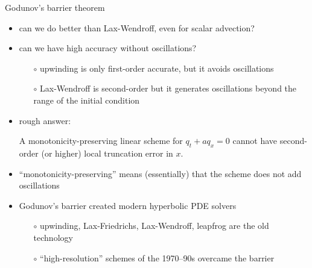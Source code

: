 \documentclass[10pt,dvipsnames,usepdftitle=false,
hyperref={pdftitle = {Finite volume methods},
    pdfauthor = {Ed Bueler}}]{beamer}
\begin{document}
\begin{frame}{Godunov's barrier theorem}

\begin{itemize}
\item can we do better than Lax-Wendroff, even for scalar advection?
\item can we have high accuracy without oscillations?
    \begin{itemize}
    \item[$\circ$] upwinding is only first-order accurate, but it avoids oscillations
    \item[$\circ$] Lax-Wendroff is second-order but it generates oscillations beyond the range of the initial condition
    \end{itemize}
\item rough answer: 

\medskip
\begin{theorem}  A monotonicity-preserving \alert<2>{linear} scheme for $q_t + a q_x=0$ cannot have second-order (or higher) local truncation error in $x$.\end{theorem}

\item ``monotonicity-preserving'' means (essentially) that the scheme does not add oscillations
\item Godunov's barrier created modern hyperbolic PDE solvers
    \begin{itemize}
    \item[$\circ$] upwinding, Lax-Friedrichs, Lax-Wendroff, leapfrog are the old technology
    \item[$\circ$] ``high-resolution'' schemes of the 1970--90s overcame the barrier 
    \end{itemize}
\end{itemize}
\end{frame}
\end{document}
